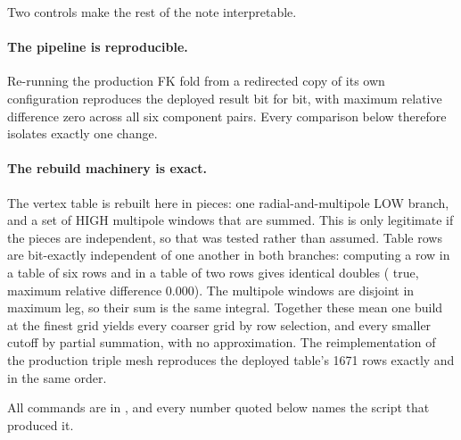 Two controls make the rest of the note interpretable.

\paragraph{The pipeline is reproducible.} Re-running the production FK fold
from a redirected copy of its own configuration reproduces the deployed
result bit for bit, with maximum relative difference zero across all six
component pairs. Every comparison below therefore isolates exactly one
change.

\paragraph{The rebuild machinery is exact.} The vertex table is rebuilt
here in pieces: one radial-and-multipole LOW branch, and a set of HIGH
multipole windows that are summed. This is only legitimate if the pieces
are independent, so that was tested rather than assumed. Table rows are
bit-exactly independent of one another in both branches: computing a row in
a table of six rows and in a table of two rows gives identical doubles
( true, maximum relative difference $0.000$). The
multipole windows are disjoint in maximum leg, so their sum is the same
integral. Together these mean one build at the finest grid yields every
coarser grid by row selection, and every smaller cutoff by partial
summation, with no approximation. The reimplementation of the production
triple mesh reproduces the deployed table's 1671 rows exactly and in the
same order.

All commands are in , and every number
quoted below names the script that produced it.
